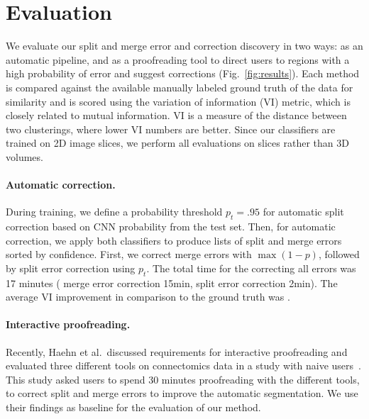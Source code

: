 \section{Evaluation}

We evaluate our split and merge error and correction discovery in two ways: as an automatic pipeline, and as a proofreading tool to direct users to regions with a high probability of error and suggest corrections (Fig.~\ref{fig:results}). Each method is compared against the available manually labeled ground truth of the data for similarity and is scored using the variation of information (VI) metric, which is closely related to mutual information. VI is a measure of the distance between two clusterings, where lower VI numbers are better. Since our classifiers are trained on 2D image slices, we perform all evaluations on slices rather than 3D volumes. 

\paragraph{Automatic correction.} During training, we define a probability threshold $p_t=.95$  for automatic split correction based on CNN probability from the test set. Then, for automatic correction, we apply both classifiers to produce lists of split and merge errors sorted by confidence. First, we correct merge errors with $\max(1-p)$, followed by split error correction using $p_t$. The total time for the correcting all \JT{\#} errors was 17 minutes (\JT{\#} merge error correction 15min, \JT{\#} split error correction 2min). The average VI improvement in comparison to the ground truth was .

\paragraph{Interactive proofreading.}
Recently, Haehn et al.~discussed requirements for interactive proofreading and evaluated three different tools on connectomics data in a study with naive users~\cite{haehn_dojo_2014}. %
This study asked users to spend 30 minutes proofreading with the different tools, to correct split and merge errors to improve the automatic segmentation. We use their findings as baseline for the evaluation of our method.

